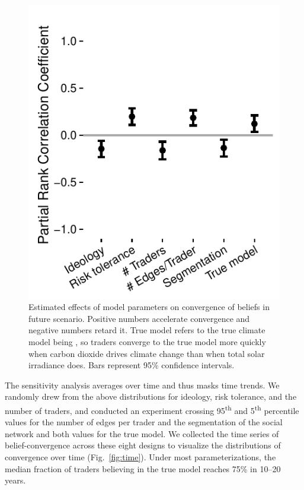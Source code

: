 \documentclass{wscpaperproc}\usepackage[]{graphicx}\usepackage[]{color}
\makeatletter
\def\maxwidth{ %
  \ifdim\Gin@nat@width>\linewidth
    \linewidth
  \else
    \Gin@nat@width
  \fi
}
\newenvironment{knitrout}{}{} %
\makeatother
\begin{document}
\begin{knitrout}
\color{fgcolor}\begin{figure}[t]

{\centering \includegraphics[width=\maxwidth]{figure/sa-1} 

}

\caption[Estimated effects of model parameters on convergence of beliefs in future scenario]{Estimated effects of model parameters on convergence of beliefs in future scenario. Positive numbers accelerate convergence and negative numbers retard it. True model refers to the true climate model being , so traders converge to the true model more quickly when carbon dioxide drives climate change than when total solar irradiance does. Bars represent 95\% confidence intervals.}\label{fig:sa}
\end{figure}


\end{knitrout}

The sensitivity analysis averages over time and thus masks time trends. We randomly drew from the above distributions for ideology, risk tolerance, and the number of traders, and conducted an experiment crossing 95\textsuperscript{th} and 5\textsuperscript{th} percentile values for the number of edges per trader and the segmentation of the social network and both values for the true model. We collected the time series of belief-convergence across these eight designs to visualize the distributions of convergence over time (Fig.~\ref{fig:time}). Under most parameterizations, the median fraction of traders believing in the true model reaches 75\% in 10--20 years.
\end{document}

